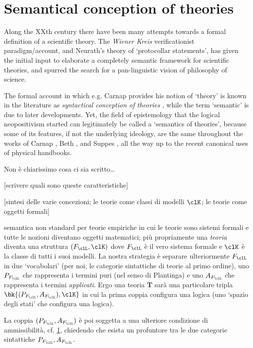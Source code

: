 \section{Semantical conception of theories}
Along the XXth century there have been many attempts towards a formal definition of a scientific theory. The \emph{Wiener Kreis} verificationist paradigm/account, and Neurath's theory of `protocollar statements', has given the initial input to elaborate a completely semantic framework for scientific theories, and spurred the search for a pan-linguistic vision of philosophy of science.

The formal account in which e.g. Carnap \cite{?} provides his notion of `theory' is known in the literature as \emph{syntactical conception of theories} \cite{?}, while the term `semantic' is due to later developments. Yet, the field of epistemology that the logical neopositivism started can legitimately be called a `semantics of theories', because some of its features, if not the underlying ideology, are the same throughout the works of Carnap \cite{?},  Beth \cite{?}, and Suppes \cite{?}, all the way up to the recent canonical uses of physical handbooks.

{\color{red} Non è chiarissimo cosa ci sia scritto\dots}

	[scrivere quali sono queste caratteristiche]

	[sintesi delle varie concezioni; le teorie come classi di modelli $\clK$;
		le teorie come oggetti formali]

semantica non standard per teorie empiriche in cui le teorie sono sistemi formali e tutte le nozioni diventano oggetti matematici; più propriamente una \emph{teoria} diventa una struttura $(F_\clL, \clK)$ dove $F_\clL$ è il vero sistema formale e $\clK$ è la classe di tutti i suoi modelli. La nostra strategia è separare ulteriormente $F_\clL$ in due `vocabolari' (per noi, le categorie sintattiche di teorie al primo ordine), uno $P_{F_\clL}$ che rappresenta i termini puri (nel senso di Plantinga) e uno $A_{F_\clL}$ che rappresenta i termini \emph{applicati}. Ergo una teoria $\mathbf{T}$ sarà una particolare tripla $\bk{(P_{F_\clL},A_{F_\clL}), \clK}$ in cui la prima coppia configura una logica (uno `spazio degli stati' che configura una logica).

La coppia $(P_{F_\clL},A_{F_\clL})$ è poi soggetta a una ulteriore condizione di ammissibilità, cf. \ref{}, chiedendo che esista un profuntore tra le due categorie sintattiche $P_{F_\clL},A_{F_\clL}$.

